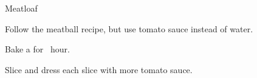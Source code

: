 \begin{recipe}{Meatloaf}{}{}

\begin{directions}
\item Follow the meatball recipe, but use tomato sauce instead of water.
\item Bake a  for \half~hour.
\item Slice and dress each slice with more tomato sauce.
\end{directions}
\end{recipe}
